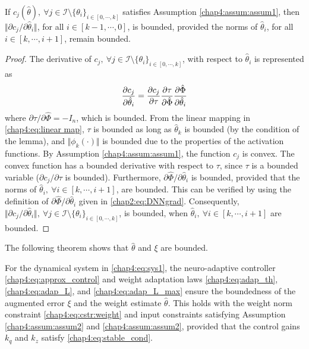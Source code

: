 \begin{lemma} 
    If $c_j(\hat\theta),\ \forall j\in\mathcal I \setminus \{\theta_i\}_{i\in[0,\cdots,k]}$ satisfies Assumption \ref{chap4:assum:assum1}, then $\Vert\partial c_j/\partial\hat\theta_i\Vert \allowbreak $, for all $i\in[k-1,\cdots, 0]$, is bounded, provided the norms of $\hat\theta_i$, for all $i\in[k,\cdots, i+1]$, remain bounded.
    \label{chap4:lem:lem2}
\end{lemma}

\begin{proof}

The derivative of $c_j,\ \forall j\in\mathcal I \setminus \{\theta_i\}_{i\in[0,\cdots,k]}$, with respect to $\hat\theta_i$ is represented as
\begin{equation}
    {\partial c_j\over\partial \hat\theta_i} = {\partial c_j\over\partial \tau} {\partial \tau\over\partial \hat\Phi} {\partial \hat\Phi\over\partial \hat\theta_i}
\end{equation}
where $\partial \tau/\partial \hat\Phi=-I_n$, which is bounded. From the linear mapping in \eqref{chap4:eq:linear map}, $\tau$ is bounded as long as $\hat\theta_k$ is bounded (by the condition of the lemma), and $\Vert\phi_k(\cdot)\Vert$ is bounded due to the properties of the activation functions. By Assumption \ref{chap4:assum:assum1}, the function $c_j$ is convex. The convex function has a bounded derivative with respect to $\tau$, since $\tau$ is a bounded variable (\ie $\partial c_j/\partial\tau$ is bounded). Furthermore, $\partial \hat\Phi/\partial \hat\theta_i$ is bounded, provided that the norms of $\hat\theta_i,\ \forall i \in[k,\cdots,i+1]$, are bounded. This can be verified by using the definition of $\partial \hat\Phi/\partial\hat\theta_i$ given in \eqref{chap2:eq:DNNgrad}.
Consequently, $\Vert\partial c_j/\partial \hat\theta_i\Vert,\ \forall j\in\mathcal I \setminus \{\theta_i\}_{i\in[0,\cdots,k]}$, is bounded, when $\hat\theta_i,\ \forall i\in [k,\cdots,i+1]$ are bounded.

\end{proof}

The following theorem shows that $\hat\theta$ and $\xi$ are bounded.

\begin{theorem}
    For the dynamical system in \eqref{chap4:eq:sys1}, the neuro-adaptive controller \eqref{chap4:eq:approx_control} and weight adaptation laws \eqref{chap4:eq:adap_th}, \eqref{chap4:eq:adap_L}, and \eqref{chap4:eq:adap_L_max} ensure the boundedness of the augmented error $\xi$ and the weight estimate $\hat \theta$. This holds with the weight norm constraint \eqref{chap4:eq:cstr:weight} and input constraints satisfying Assumption \ref{chap4:assum:assum2} and \ref{chap4:assum:assum2}, provided that the control gains ${k_q}$ and ${k_z}$ satisfy \eqref{chap4:eq:stable_cond}.
\end{theorem}

